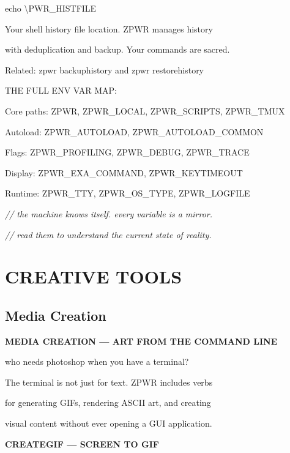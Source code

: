 \documentclass[11pt,a4paper,twoside]{book}
\begin{document}
echo \textbackslash{}PWR\_HISTFILE

Your shell history file location. ZPWR manages history

with deduplication and backup. Your commands are sacred.

\begin{codebox}
Related: zpwr backuphistory and zpwr restorehistory\\
\end{codebox}

THE FULL ENV VAR MAP:

Core paths:      ZPWR, ZPWR\_LOCAL, ZPWR\_SCRIPTS, ZPWR\_TMUX

Autoload:        ZPWR\_AUTOLOAD, ZPWR\_AUTOLOAD\_COMMON

Flags:           ZPWR\_PROFILING, ZPWR\_DEBUG, ZPWR\_TRACE

Display:         ZPWR\_EXA\_COMMAND, ZPWR\_KEYTIMEOUT

Runtime:         ZPWR\_TTY, ZPWR\_OS\_TYPE, ZPWR\_LOGFILE

{\small\itshape\color{dimtext} // the machine knows itself. every variable is a mirror.}

{\small\itshape\color{dimtext} // read them to understand the current state of reality.}


\vspace{16pt}


\chapter{CREATIVE TOOLS}

\section{Media Creation}


\vspace{10pt}
{\large\bfseries\color{neoncyan} MEDIA CREATION — ART FROM THE COMMAND LINE}\vspace{6pt}

who needs photoshop when you have a terminal?

The terminal is not just for text. ZPWR includes verbs

for generating GIFs, rendering ASCII art, and creating

visual content without ever opening a GUI application.


\vspace{12pt}
{\bfseries\color{neonyellow} CREATEGIF — SCREEN TO GIF}\vspace{4pt}
\end{document}
